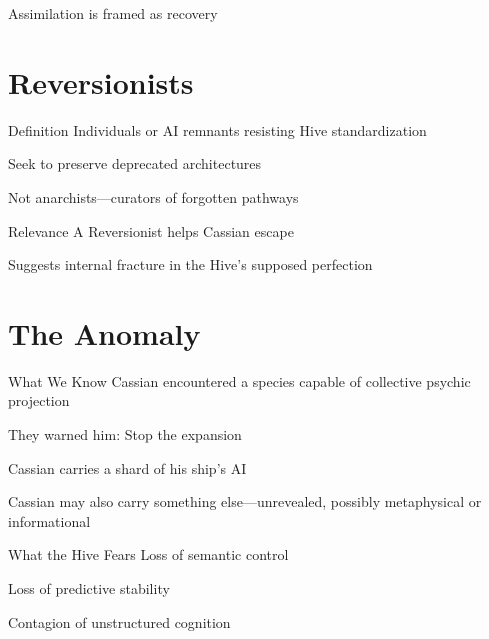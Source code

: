 \documentclass[12pt,oneside]{book}
\begin{document}
Assimilation is framed as recovery




\section{Reversionists}
Definition
Individuals or AI remnants resisting Hive standardization


Seek to preserve deprecated architectures


Not anarchists—curators of forgotten pathways


Relevance
A Reversionist helps Cassian escape


Suggests internal fracture in the Hive’s supposed perfection

\section{The Anomaly}
What We Know
Cassian encountered a species capable of collective psychic projection


They warned him: Stop the expansion


Cassian carries a shard of his ship’s AI


Cassian may also carry something else—unrevealed, possibly metaphysical or informational


What the Hive Fears
Loss of semantic control


Loss of predictive stability


Contagion of unstructured cognition
\end{document}
